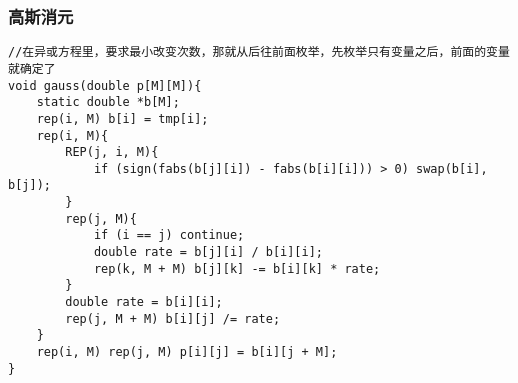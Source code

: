 \subsubsection{高斯消元}
\begin{verbatim}
//在异或方程里，要求最小改变次数，那就从后往前面枚举，先枚举只有变量之后，前面的变量就确定了
void gauss(double p[M][M]){
    static double *b[M];
    rep(i, M) b[i] = tmp[i];
    rep(i, M){
        REP(j, i, M){
            if (sign(fabs(b[j][i]) - fabs(b[i][i])) > 0) swap(b[i], b[j]);
        }
        rep(j, M){
            if (i == j) continue;
            double rate = b[j][i] / b[i][i];
            rep(k, M + M) b[j][k] -= b[i][k] * rate;
        }
        double rate = b[i][i];
        rep(j, M + M) b[i][j] /= rate;
    }
    rep(i, M) rep(j, M) p[i][j] = b[i][j + M];
}
\end{verbatim}
